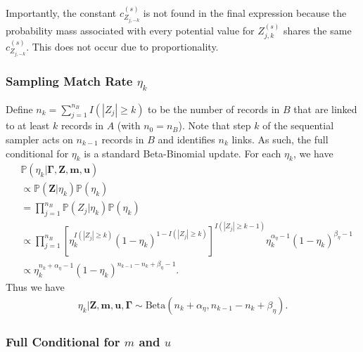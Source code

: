 \documentclass[12pt,letterpaper]{article}
\newcommand{\1}[1]{\mathbb{I}\!\left[#1\right]} %
\begin{document}
Importantly, the constant $c_{Z_{j, -k}}^{(s)}$ is not found in the final expression because the probability mass associated with every potential value for $Z_{j, k}^{(s)}$ shares the same $c_{Z_{j, -k}}^{(s)}$. This does not occur due to proportionality. 

\subsubsection{Sampling Match Rate $\eta_k$}\label{app:sample-eta}

Define $n_k = \sum_{j=1}^{n_B} I\left(|Z_j| \geq k\right)$ to be the number of records in $B$ that are linked to at least $k$ records in $A$ (with $n_0 = n_B$). Note that step $k$ of the sequential sampler acts on $n_{k-1}$ records in $B$ and identifies $n_k$ links. As such, the full conditional for $\eta_k$ is a standard Beta-Binomial update. For each $\eta_k$, we have
\begin{align*}
	&\mathbb{P}\left(\eta_k \big| \bm{\Gamma}, \bm{Z}, \bm{m}, \bm{u}\right) \\
	&\propto \mathbb{P}\left(\bm{Z}| \eta_k\right) \mathbb{P}(\eta_k) \\
	&=\prod_{j=1}^{n_B} \mathbb{P}\left(Z_{j} | \eta_k\right) \mathbb{P}(\eta_k) \\
	&\propto \prod_{j=1}^{n_B} \left[\eta_k^{I\left(|Z_j| \geq k \right)} (1 - \eta_k)^{1 - I\left(|Z_j| \geq k \right)}\right]^{I\left(|Z_j| \geq k-1 \right)} \eta_k^{\alpha_{\eta} - 1}(1 - \eta_k)^{\beta_{\eta} - 1} \\
	&\propto \eta_k^{n_{k} + \alpha_{\eta} - 1} (1 - \eta_k)^{n_{k-1} - n_{k} + \beta_{\eta} - 1}.
\end{align*}
Thus we have
\begin{align*}
	\eta_k |\bm{Z}, \bm{m}, \bm{u}, \bm{\Gamma} \sim \text{Beta}\left(n_{k} + \alpha_{\eta}, n_{k-1} - n_{k} + \beta_{\eta} \right).
\end{align*}

\subsubsection{Full Conditional for $m$ and $u$}\label{app:derive-m-u}
\end{document}
